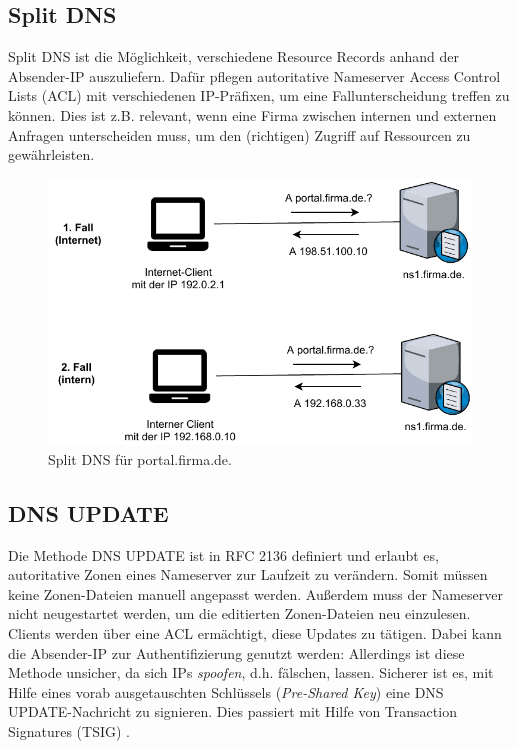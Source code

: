 \subsection{Split DNS}
Split DNS ist die Möglichkeit, verschiedene Resource Records anhand der Absender-IP auszuliefern. Dafür pflegen autoritative Nameserver Access Control Lists (ACL) mit verschiedenen IP-Präfixen, um eine Fallunterscheidung treffen zu können\cite[S.565-567]{Fall2011}. Dies ist z.B. relevant, wenn eine Firma zwischen internen und externen Anfragen unterscheiden muss, um den (richtigen) Zugriff auf Ressourcen zu gewährleisten.

\begin{figure}[h]
  \centering
  \includegraphics{Figures/dns_split_view.pdf}
  \caption{Split DNS für portal.firma.de.}
  \label{grafik: split-dns}
\end{figure}\FloatBarrier

\subsection{DNS UPDATE}
Die Methode DNS UPDATE ist in RFC 2136 definiert und erlaubt es, autoritative Zonen eines Nameserver zur Laufzeit zu verändern\cite{rfc2136}. Somit müssen keine Zonen-Dateien manuell angepasst werden. Außerdem muss der Nameserver nicht neugestartet werden, um die editierten Zonen-Dateien neu einzulesen.\\
Clients werden über eine ACL ermächtigt, diese Updates zu tätigen. Dabei kann die Absender-IP zur Authentifizierung genutzt werden: Allerdings ist diese Methode unsicher, da sich IPs \textit{spoofen}, d.h. fälschen, lassen\cite[S.70-71]{Fall2011}. Sicherer ist es, mit Hilfe eines vorab ausgetauschten Schlüssels (\textit{Pre-Shared Key}) eine DNS UPDATE-Nachricht zu signieren. Dies passiert mit Hilfe von Transaction Signatures (TSIG) \cite[S.911-914]{Fall2011}.

